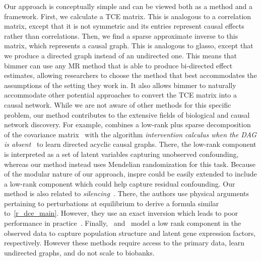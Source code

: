 \documentclass{article}
\begin{document}
Our approach is conceptually simple and can be viewed both as a method and a framework.
First, we calculate a TCE matrix.
This is analogous to a correlation matrix, except that it is not symmetric and its entries
represent causal effects rather than correlations. Then, we find a sparse approximate inverse
to this matrix, which represents a causal graph.
This is analogous to glasso, except that we produce a directed graph instead
of an undirected one. This means that bimmer can use any MR method
that is able to produce bi-directed effect estimates,
allowing researchers to choose the method that best accommodates the assumptions of
the setting they work in. It also allows bimmer to naturally accommodate other potential
approaches to convert the TCE matrix into a causal network.
While we are not aware of other methods for this specific problem, our method contributes to the
extensive fields of biological and causal network discovery.
For example, \cite{Frot2019a} combines a low-rank plus sparse decomposition
of the covariance matrix~\cite{Frot2019b,Chandrasekaran2012} with
the algorithm \emph{intervention calculus when the
DAG is absent}~\cite{Maathuis2009} to learn directed acyclic causal graphs. There, the low-rank
component is interpreted as a set of latent variables capturing unobserved confounding, whereas
our method instead uses Mendelian randomization for this task.
Because of the modular nature of our approach, inspre could be easily
extended to include a low-rank component which could help capture residual confounding.
Our method is also related to \emph{silencing}~\cite{Barzel2013}. There,
the authors use physical arguments pertaining to perturbations at equilibrium to derive
a formula similar to~\eqref{r_dce_main}. However, they use an exact inversion which
leads to poor performance in practice~\cite{Pachter}. Finally,~\cite{Dahl2013} and~\cite{Stegle2011}
model a low rank component in the observed data to capture population structure and latent
gene expression factors, respectively. However these methods require access to the primary data,
learn undirected graphs, and do not scale to biobanks.
\end{document}

